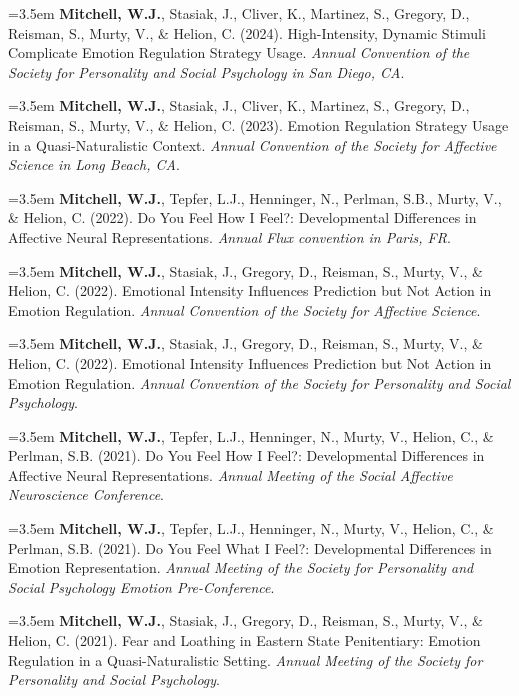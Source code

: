 
\hangindent=3.5em
\textbf{Mitchell, W.J.}, Stasiak, J., Cliver, K., Martinez, S., Gregory, D., Reisman, S., Murty, V., \& Helion, C. (2024). High-Intensity, Dynamic Stimuli Complicate Emotion Regulation Strategy Usage. \textit{Annual Convention of the Society for Personality and Social Psychology in San Diego, CA}.

\hangindent=3.5em
\textbf{Mitchell, W.J.}, Stasiak, J., Cliver, K., Martinez, S., Gregory, D., Reisman, S., Murty, V., \& Helion, C. (2023). Emotion Regulation Strategy Usage in a Quasi-Naturalistic Context. \textit{Annual Convention of the Society for Affective Science in Long Beach, CA}.

\hangindent=3.5em
\textbf{Mitchell, W.J.}, Tepfer, L.J., Henninger, N., Perlman, S.B., Murty, V., \& Helion, C. (2022). Do You Feel How I Feel?: Developmental
Differences in Affective Neural Representations. \textit{Annual Flux convention in Paris, FR}. \href{https://www.youtube.com/watch?v=V6gwc6Ss1kg}{}

\hangindent=3.5em
\textbf{Mitchell, W.J.}, Stasiak, J., Gregory, D., Reisman, S., Murty, V., \& Helion, C. (2022). Emotional Intensity Influences Prediction but
Not Action in Emotion Regulation. \textit{Annual Convention of the Society for Affective Science}.\href{https://www.youtube.com/watch?v=eVhc9k2PZ8k}{}

\hangindent=3.5em
\textbf{Mitchell, W.J.}, Stasiak, J., Gregory, D., Reisman, S., Murty, V., \& Helion, C. (2022). Emotional Intensity Influences Prediction but
Not Action in Emotion Regulation. \textit{Annual Convention of the Society for Personality and Social Psychology}.
\href{https://www.youtube.com/watch?v=imL2EMoqRWs}{}

\hangindent=3.5em
\textbf{Mitchell, W.J.}, Tepfer, L.J., Henninger, N., Murty, V., Helion, C., \& Perlman, S.B. (2021). Do You Feel How I Feel?: Developmental
Differences in Affective Neural Representations. \textit{Annual Meeting of the Social Affective Neuroscience Conference}. \href{https://youtu.be/ucwGXVEUDuA}{}

\hangindent=3.5em
\textbf{Mitchell, W.J.}, Tepfer, L.J., Henninger, N., Murty, V., Helion, C., \& Perlman, S.B. (2021). Do You Feel What I Feel?: Developmental
Differences in Emotion Representation. \textit{Annual Meeting of the Society for Personality and Social Psychology Emotion Pre-Conference}.\href{https://youtu.be/X6H7pUEdow8}{}

\hangindent=3.5em
\textbf{Mitchell, W.J.}, Stasiak, J., Gregory, D., Reisman, S., Murty, V., \& Helion, C. (2021). Fear and Loathing in Eastern State Penitentiary:
Emotion Regulation in a Quasi-Naturalistic Setting. \textit{Annual Meeting of the Society for Personality and Social Psychology}.